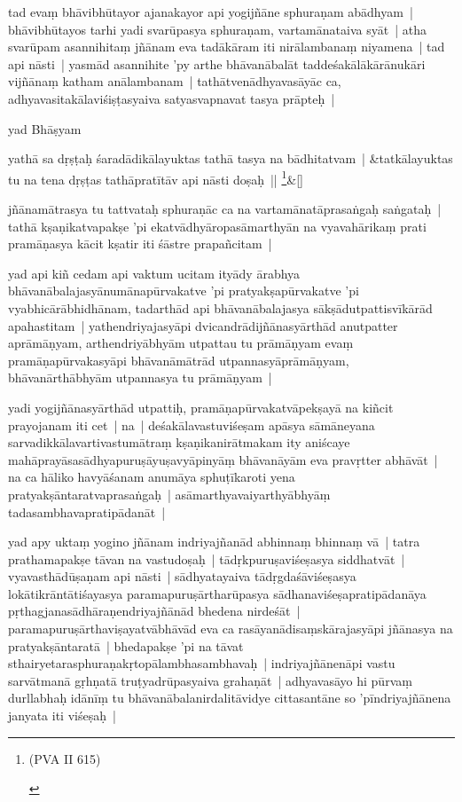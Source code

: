 \documentclass[article,12pt,a4paper]{memoir}
\newcommand{\name}[1]{#1}
\begin{document}
	

	  \pstart tad evaṃ bhāvibhūtayor ajanakayor api yogijñāne sphuraṇam abādhyam | bhāvibhūtayos tarhi yadi svarūpasya sphuraṇam, vartamānataiva syāt | atha svarūpam asannihitaṃ jñānam eva tadākāram iti nirālambanaṃ niyamena | tad api nāsti | yasmād asannihite 'py arthe bhāvanābalāt taddeśakālākārānukāri vijñānaṃ katham anālambanam | tathātvenādhyavasāyāc ca, adhyavasitakālaviśiṣṭasyaiva satyasvapnavat tasya prāpteḥ | 
	\pend
      

	  \pstart yad \name{Bhāṣyam}
	\pend
      
	    
	    \stanza[\smallbreak]
	yathā sa dṛṣṭaḥ śaradādikālayuktas tathā tasya na bādhitatvam | &tatkālayuktas tu na tena dṛṣṭas tathāpratītāv api nāsti doṣaḥ || \footnote{\begin{english}(PVA II 615)\end{english}}\&[\smallbreak]


	

	  \pstart jñānamātrasya tu tattvataḥ sphuraṇāc ca na vartamānatāprasaṅgaḥ saṅgataḥ | tathā kṣaṇikatvapakṣe 'pi ekatvādhyāropasāmarthyān na vyavahārikaṃ prati pramāṇasya kācit kṣatir iti śāstre prapañcitam | 
	\pend
      

	  \pstart yad api kiñ cedam api vaktum ucitam ityādy ārabhya bhāvanābalajasyānumānapūrvakatve 'pi pratyakṣapūrvakatve 'pi vyabhicārābhidhānam, tadarthād api bhāvanābalajasya sākṣādutpattisvīkārād apahastitam | yathendriyajasyāpi dvicandrādijñānasyārthād anutpatter aprāmāṇyam, arthendriyābhyām utpattau tu prāmāṇyam evaṃ pramāṇapūrvakasyāpi bhāvanāmātrād utpannasyāprāmāṇyam, bhāvanārthābhyām utpannasya tu prāmāṇyam | 
	\pend
      

	  \pstart yadi yogijñānasyārthād utpattiḥ, pramāṇapūrvakatvāpekṣayā na kiñcit prayojanam iti cet | na | deśakālavastuviśeṣam apāsya sāmāneyana sarvadikkālavartivastumātraṃ kṣaṇikanirātmakam ity aniścaye mahāprayāsasādhyapuruṣāyuṣavyāpinyāṃ bhāvanāyām eva pravṛtter abhāvāt | na ca hāliko havyāśanam anumāya sphuṭīkaroti yena pratyakṣāntaratvaprasaṅgaḥ | asāmarthyavaiyarthyābhyāṃ tadasambhavapratipādanāt | 
	\pend
      

	  \pstart yad apy uktaṃ yogino jñānam indriyajñanād abhinnaṃ bhinnaṃ vā | tatra prathamapakṣe tāvan na vastudoṣaḥ | tādṛkpuruṣaviśeṣasya siddhatvāt | vyavasthādūṣaṇam api nāsti | sādhyatayaiva tādṛgdaśāviśeṣasya lokātikrāntātiśayasya paramapuruṣārtharūpasya sādhanaviśeṣapratipādanāya pṛthagjanasādhāraṇendriyajñānād bhedena nirdeśāt | paramapuruṣārthaviṣayatvābhāvād eva ca rasāyanādisaṃskārajasyāpi jñānasya na pratyakṣāntaratā | bhedapakṣe 'pi na tāvat sthairyetarasphuraṇakṛtopālambhasambhavaḥ | indriyajñānenāpi vastu sarvātmanā gṛhṇatā truṭyadrūpasyaiva grahaṇāt | adhyavasāyo hi pūrvaṃ durllabhaḥ idānīṃ tu bhāvanābalanirdalitāvidye cittasantāne so 'pīndriyajñānena janyata iti viśeṣaḥ | 
	\pend
      
\end{document}
